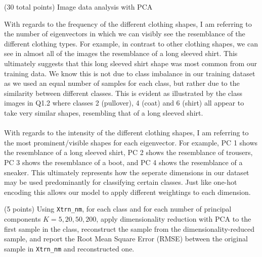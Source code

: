 \documentclass[12pt]{article}
\begin{document}
\begin{question}{(30 total points) Image data analysis with PCA}
\begin{subquestion}
\begin{answerbox}{35em}
{        With regards to the frequency of the different clothing shapes, I am referring to the number of eigenvectors in which we can visibly see the resemblance of the different clothing types. For example, in contrast to other clothing shapes, we can see in almost all of the images the resemblance of a long sleeved shirt. This ultimately suggests that this long sleeved shirt shape was most common from our training data. We know this is not due to class imbalance in our training dataset as we used an equal number of samples for each class, but rather due to the similarity between different classes. This is evident as illustrated by the class images in Q1.2 where classes 2 (pullover), 4 (coat) and 6 (shirt) all appear to take very similar shapes, resembling that of a long sleeved shirt.\\
\\
        With regards to the intensity of the different clothing shapes, I am referring to the most prominent/visible shapes for each eigenvector. For example, PC 1 shows the resemblance of a long sleeved shirt, PC 2 shows the resemblance of trousers, PC 3 shows the resemblance of a boot, and PC 4 shows the resemblance of a sneaker. This ultimately represents how the seperate dimensions in our dataset may be used predominantly for classifying certain classes. Just like one-hot encoding this allows our model to apply different weightings to each dimension.
}
      \end{answerbox}
  


   \end{subquestion}

   \begin{subquestion}{(5 points)
       Using \texttt{Xtrn\_nm}, 
       for each class and for each number of principal components $K =
       5, 20, 50, 200$, apply dimensionality reduction with PCA to the
       first sample in the class, reconstruct the sample from the
       dimensionality-reduced sample, and 
       report the Root Mean Square Error (RMSE) between the
       original sample in {\tt Xtrn\_nm} and reconstructed one.
     } \label{Q1.6}

     


\end{subquestion}
\end{question}
\end{document}
